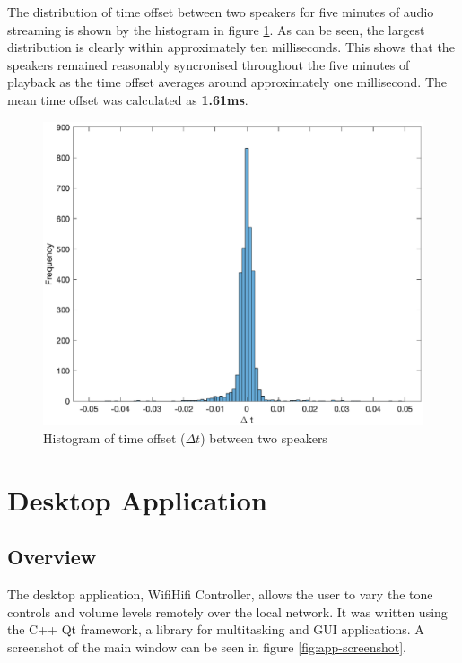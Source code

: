 \documentclass[main.tex]{subfiles}
\begin{document}
\medskip
The distribution of time offset between two speakers for five minutes of audio streaming is shown by the histogram in figure \ref{fig:histogram}.
As can be seen, the largest distribution is clearly within approximately ten milliseconds.
This shows that the speakers remained reasonably syncronised throughout the five minutes of playback as the time offset averages around approximately one millisecond.
The mean time offset was calculated as \textbf{1.61ms}.

\begin{figure}[H]
    \centering
    \includegraphics[scale=0.75]{./figs/histogram.eps}        
    \caption{Histogram of time offset ($\Delta t$) between two speakers}
    \label{fig:histogram}
\end{figure}

\section{Desktop Application}
\subsection{Overview}
The desktop application, WifiHifi Controller, allows the user to vary the tone controls and volume levels remotely over the local network.
It was written using the C++ Qt framework, a library for multitasking and GUI applications.
A screenshot of the main window can be seen in figure \ref{fig:app-screenshot}.
\end{document}
